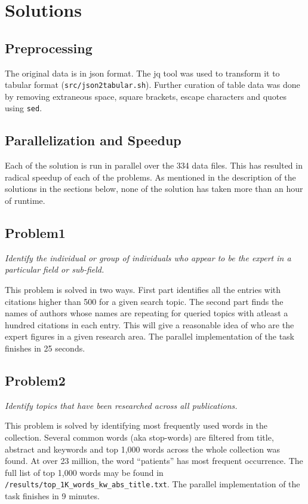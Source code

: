 \documentclass{article}
\begin{document}
\section*{Solutions}
\subsection*{Preprocessing}
The original data is in json format. The jq tool was used to transform it to
tabular format (\texttt{src/json2tabular.sh}). Further curation of table data
was done by removing extraneous space, square brackets, escape characters and
quotes using \texttt{sed}.

\subsection*{Parallelization and Speedup}
Each of the solution is run in parallel over the 334 data files. This has
resulted in radical speedup of each of the problems. As mentioned in the
description of the solutions in the sections below, none of the solution has
taken more than an hour of runtime.

\subsection*{Problem1}
\textit{Identify the individual or group of individuals who appear to be the expert in a particular field or sub-field.}

This problem is solved in two ways. First part identifies all the entries with
citations higher than 500 for a given search topic. The second part finds the
names of authors whose names are repeating for queried topics with atleast a
hundred citations in each entry. This will give a reasonable idea of who are
the expert figures in a given research area. The parallel implementation of the
task finishes in 25 seconds.

\subsection*{Problem2}
\textit{Identify topics that have been researched across all publications.}

This problem is solved by identifying most frequently used words in the
collection. Several common words (aka stop-words) are filtered from title,
abstract and keywords and top 1,000 words across the whole collection was
found. At over 23 million, the word ``patients'' has most frequent occurrence.
The full list of top 1,000 words may be found in
\texttt{/results/top\_1K\_words\_kw\_abs\_title.txt}.  The parallel
implementation of the task finishes in 9 minutes.
\end{document}
